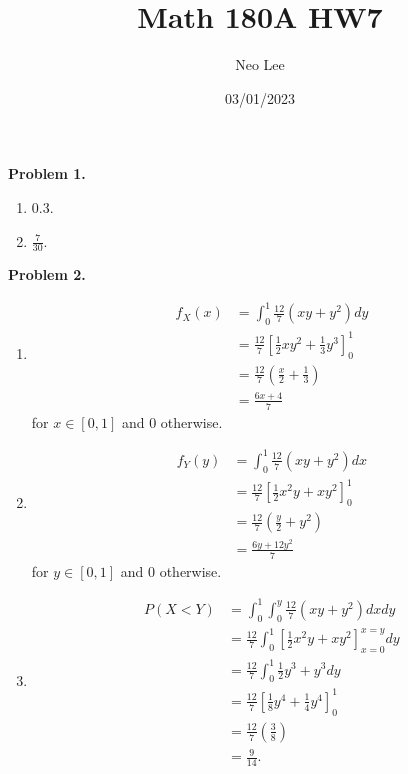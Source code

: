 \documentclass{article}
\title{Math 180A HW7}
\author{Neo Lee}
\date{03/01/2023}
\begin{document}
 

\maketitle 

\textbf{Problem 1.}
\begin{enumerate}[label={(\alph*)}]
    \item 0.3.
    \item $\frac{7}{30}$.
\end{enumerate}
\bigbreak

\textbf{Problem 2.}
\begin{enumerate}[label={(\alph*)}]
    \item 
    \begin{align}
        f_X(x) & = \int_{0}^{1} \frac{12}{7}(xy+y^2)dy \\
        & = \frac{12}{7}\left[\frac{1}{2}xy^2+\frac{1}{3}y^3\right]_0^1 \\
        & = \frac{12}{7}\left(\frac{x}{2}+\frac{1}{3}\right) \\
        & = \frac{6x+4}{7}
    \end{align}
    for $x \in [0,1]$ and 0 otherwise.

    \item 
    \begin{align}
        f_Y(y) & = \int_{0}^{1} \frac{12}{7}(xy+y^2)dx \\
        & = \frac{12}{7}\left[\frac{1}{2}x^2y+xy^2\right]_0^1 \\
        & = \frac{12}{7}\left(\frac{y}{2}+y^2\right) \\
        & = \frac{6y + 12y^2}{7}
    \end{align}
    for $y \in [0,1]$ and 0 otherwise.

    \item 
    \begin{align}
        P(X<Y) & = \int_{0}^{1}\int_{0}^{y} \frac{12}{7}(xy+y^2)dxdy \\
        & = \frac{12}{7}\int_{0}^{1}\left[\frac{1}{2}x^2y+xy^2\right]_{x=0}^{x=y} dy \\
        & = \frac{12}{7}\int_{0}^{1} \frac{1}{2}y^3+y^3dy \\
        & = \frac{12}{7}\left[\frac{1}{8}y^4+\frac{1}{4}y^4\right]_0^1 \\
        & = \frac{12}{7}\left(\frac{3}{8}\right) \\
        & = \frac{9}{14}.
    \end{align}
\end{enumerate}
\bigbreak
\end{document}
